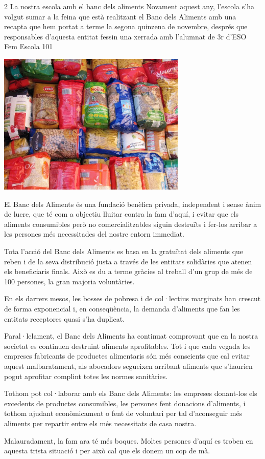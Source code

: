 \begin{news}
{2} %
{La nostra escola amb el banc dels aliments}
{Novament aquest any, l’escola s’ha volgut sumar a la feina que està realitzant el Banc dels Aliments amb una recapta que hem portat a terme la segona quinzena de novembre, després que responsables d’aquesta entitat fessin una xerrada amb l’alumnat de 3r d’ESO}
{Fem Escola}
{101} %

\noindent\includegraphics[width=9cm,keepaspectratio]{fem_escola/img/aliments.jpg}

El Banc dels Aliments és una fundació benèfica privada, independent i sense ànim de lucre, que té com a objectiu lluitar contra la fam d’aquí, i evitar que els aliments consumibles però no comercialitzables siguin destruïts i fer-los arribar a les persones més necessitades del nostre entorn immediat.

Tota l’acció del Banc dels Aliments es basa en la gratuïtat dels aliments que reben i de la seva distribució justa a través de les entitats solidàries que atenen els beneficiaris finals. Això es du a terme gràcies al treball d’un grup de més de 100 persones, la gran majoria voluntàries.

En els darrers mesos, les bosses de pobresa i de col·lectius marginats han crescut de forma exponencial i, en conseqüència, la demanda d’aliments que fan les entitats receptores quasi s'ha duplicat.

Paral·lelament, el Banc dels Aliments ha continuat comprovant que en la nostra societat es continuen destruint aliments aprofitables. Tot i que cada vegada les empreses fabricants de productes alimentaris són més conscients que cal evitar aquest malbaratament, als abocadors segueixen arribant aliments que s’haurien pogut aprofitar complint totes les normes sanitàries.

Tothom pot col·laborar amb els Banc dels Aliments: les empreses donant-los els excedents de productes consumibles, les persones fent donacions d’aliments, i tothom ajudant econòmicament o fent de voluntari per tal d'aconseguir més aliments per repartir entre els més necessitats de casa nostra.

Malauradament, la fam ara té més boques. Moltes persones d’aquí es troben en aquesta trista situació i per això cal que els donem un cop de mà.

\end{news}
